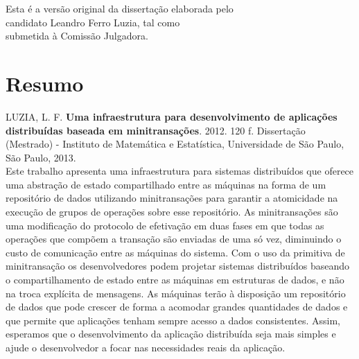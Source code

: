 \documentclass[11pt,twoside,a4paper]{book}
\begin{document}
    \vskip 2cm

    \begin{flushright}
	Esta é a versão original da dissertação elaborada pelo\\
	candidato Leandro Ferro Luzia, tal como \\
	submetida à Comissão Julgadora.
    \end{flushright}

\pagebreak



\chapter*{Resumo}

\noindent LUZIA, L. F. \textbf{Uma infraestrutura para desenvolvimento de aplicações distribuídas baseada em minitransações}. 
2012. 120 f.
Dissertação (Mestrado) - Instituto de Matemática e Estatística,
Universidade de São Paulo, São Paulo, 2013.
\\

Este trabalho apresenta uma infraestrutura para sistemas distribuídos que oferece uma abstração de estado compartilhado entre as máquinas na forma de um repositório de dados utilizando minitransações para garantir a atomicidade na execução de grupos de operações sobre esse repositório. As minitransações são uma modificação do protocolo de efetivação em duas fases em que todas as operações que compõem a transação são enviadas de uma só vez, diminuindo o custo de comunicação entre as máquinas do sistema. Com o uso da primitiva de minitransação os desenvolvedores podem projetar sistemas distribuídos baseando o compartilhamento de estado entre as máquinas em estruturas de dados, e não na troca explícita de mensagens. As máquinas terão à disposição um repositório de dados que pode crescer de forma a acomodar grandes quantidades de dados e que permite que aplicações tenham sempre acesso a dados consistentes. Assim, esperamos que o desenvolvimento da aplicação distribuída seja mais simples e ajude o desenvolvedor a focar nas necessidades reais da aplicação.
\\
\end{document}
